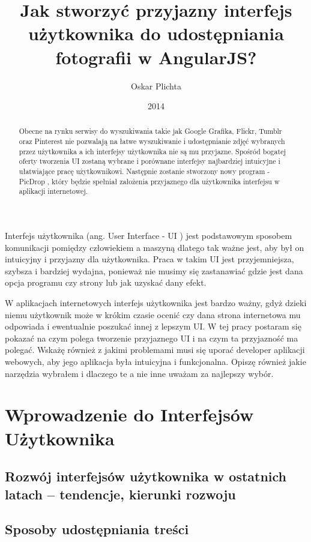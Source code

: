\documentclass[brudnopis]{xmgr}
\author   {Oskar Plichta}
\title    {Jak stworzyć przyjazny interfejs użytkownika do udostępniania fotografii w AngularJS? }
\date     {2014}
\begin{document}
\begin{abstract}
 Obecne na rynku serwisy do wyszukiwania takie jak Google Grafika, Flickr, Tumblr oraz Pinterest nie pozwalają na łatwe wyszukiwanie i udostępnianie zdjęć wybranych przez użytkownika a ich interfejsy użytkownika nie są mu przyjazne. Spośród bogatej oferty tworzenia UI zostaną wybrane i porównane interfejsy najbardziej intuicyjne i ułatwiające pracę użytkownikowi. Następnie zostanie stworzony nowy program - PicDrop , który będzie spełniał założenia przyjaznego dla użytkownika interfejsu w aplikacji internetowej.
\end{abstract}

\maketitle
%
\introduction

Interfejs użytkownika (ang. User Interface - UI ) jest podstawowym sposobem komunikacji pomiędzy człowiekiem a maszyną dlatego tak ważne jest, aby był on intuicyjny i przyjazny dla użytkownika. Praca w takim UI jest przyjemniejsza, szybsza i bardziej wydajna, ponieważ nie musimy się zastanawiać gdzie jest dana opcja programu czy strony lub jak uzyskać dany efekt. 

W aplikacjach internetowych interfejs użytkownika jest bardzo ważny, gdyż dzieki niemu użytkownik może w krókim czasie ocenić czy dana strona internetowa mu odpowiada i ewentualnie poszukać innej z lepszym UI. 
W tej pracy postaram się pokazać na czym polega tworzenie przyjaznego UI i na czym ta przyjazność ma polegać.
Wskażę również z jakimi problemami musi się uporać developer aplikacji webowych, aby jego aplikacja była intuicyjna i funkcjonalna. Opiszę również jakie narzędzia wybrałem i dlaczego te a nie inne uważam za najlepszy wybór.


\chapter{Wprowadzenie do Interfejsów Użytkownika}

\section{Rozwój interfejsów użytkownika w ostatnich latach – tendencje, kierunki rozwoju}

\section{Sposoby udostępniania treści\label{s:dtd}}
\end{document}
